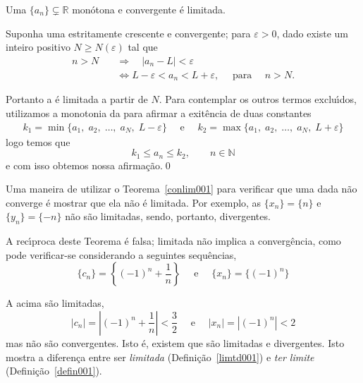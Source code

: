 \begin{fteo}\label{conlim001}
Uma \seq  $\{a_n\}\subsetneq \mathbb{R}$ mon\'{o}tona e convergente \'{e} limitada.
\end{fteo}

\prova Suponha uma \seq {} estritamente crescente e convergente; para $\varepsilon>0$, dado existe um inteiro positivo $N\geq N(\varepsilon)$ tal que
\begin{align*}
n>N \quad &\Rightarrow \quad  |a_n-L|<\varepsilon \\[2ex]
   &\Leftrightarrow L-\varepsilon<a_n<L+\varepsilon,\quad \text{ para }\quad n>N.
\end{align*}

Portanto a \seq {} \'{e} limitada a partir de $N$. Para contemplar os outros termos exclu\'{\i}dos, utilizamos a monotonia da \seq para afirmar a exit\^{e}ncia de duas constantes
\begin{align*}
    k_1=\min\{a_1,\; a_2,\; \ldots,\; a_{N},\;  L-\varepsilon  \}\quad\text{ e }\quad
    k_2=\max\{a_1,\; a_2,\; \ldots, \; a_{N},\;  L+\varepsilon  \}
\end{align*}
logo temos que
\begin{equation*}
    k_1\leq a_n\leq k_2,\qquad n\in \mathbb{N}
\end{equation*}
e com isso obtemos nossa afirma\c{c}\~{a}o.\qed

\begin{note}
Uma maneira de utilizar o Teorema~\ref{conlim001} para verificar que uma dada \seq n\~{a}o converge \'{e} mostrar que ela n\~{a}o \'{e} limitada. Por exemplo, as \seqs $\{x_n\}=\{n\}$ e $\{y_n\}=\{-n\}$  n\~{a}o s\~{a}o limitadas, sendo, portanto, divergentes.
\end{note}

\begin{obs}
A rec\'{\i}proca deste Teorema \'{e} falsa; \seq limitada n\~{a}o implica a
converg\^{e}ncia, como pode verificar-se considerando a seguintes sequ\^{e}ncias,
\begin{equation*}
    \{c_n\}=\left\{(-1)^n+\frac{1}{n} \right\}\quad \text{ e } \quad \{x_n\}=\{(-1)^n\}
\end{equation*}

A \seqs acima s\~{a}o limitadas,
\begin{equation*}
    |c_n|=\left| (-1)^n+\frac{1}{n} \right|<\frac{3}{2}\quad \text{ e }\quad |x_n|=|(-1)^n|<2
\end{equation*}
mas n\~{a}o s\~{a}o convergentes. Isto \'{e}, existem \seqs que s\~{a}o limitadas e divergentes. Isto mostra a diferen\c{c}a entre ser \emph{limitada} (Defini\c{c}\~{a}o~\ref{limtd001}) e \emph{ter limite} (Defini\c{c}\~{a}o~\ref{defin001}).
\end{obs}


